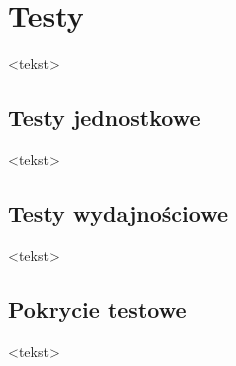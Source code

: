 \chapter{Testy}

<tekst>


\section{Testy jednostkowe}

<tekst>


\section{Testy wydajnościowe}

<tekst>


\section{Pokrycie testowe}

<tekst>
